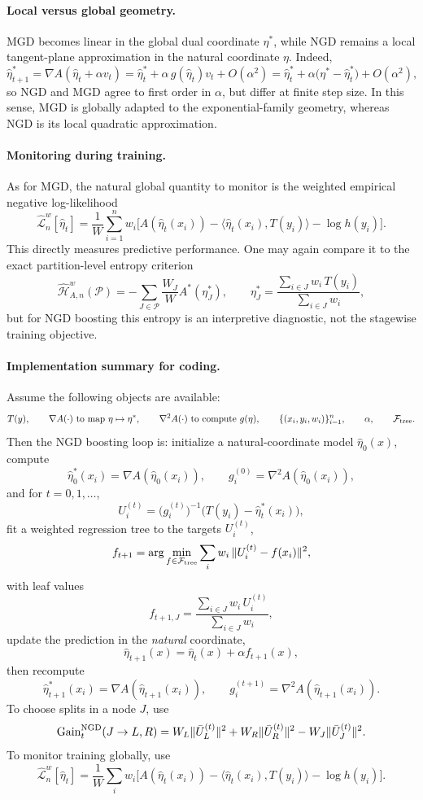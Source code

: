 \documentclass[11pt]{article}
\begin{document}
\paragraph{Local versus global geometry.}
MGD becomes linear in the global dual coordinate \(\eta^\ast\), while NGD remains a local tangent-plane approximation in the natural coordinate \(\eta\). Indeed,
\[
\hat\eta_{t+1}^\ast
=
\nabla A(\hat\eta_t+\alpha v_t)
=
\hat\eta_t^\ast+\alpha\,g(\hat\eta_t)v_t+O(\alpha^2)
=
\hat\eta_t^\ast+\alpha\big(\eta^\ast-\hat\eta_t^\ast\big)+O(\alpha^2),
\]
so NGD and MGD agree to first order in \(\alpha\), but differ at finite step size. In this sense, MGD is globally adapted to the exponential-family geometry, whereas NGD is its local quadratic approximation.

\paragraph{Monitoring during training.}
As for MGD, the natural global quantity to monitor is the weighted empirical negative log-likelihood
\[
\widehat{\mathcal L}_n^w[\hat\eta_t]
=
\frac{1}{W}\sum_{i=1}^n
w_i\Big[A(\hat\eta_t(x_i))-\langle \hat\eta_t(x_i),T(y_i)\rangle-\log h(y_i)\Big].
\]
This directly measures predictive performance. One may again compare it to the exact partition-level entropy criterion
\[
\widehat{\mathcal H}_{A,n}^w(\mathcal P)
=
-\sum_{J\in\mathcal P}\frac{W_J}{W}A^\ast(\eta_J^\ast),
\qquad
\eta_J^\ast=\frac{\sum_{i\in J}w_i\,T(y_i)}{\sum_{i\in J}w_i},
\]
but for NGD boosting this entropy is an interpretive diagnostic, not the stagewise training objective.

\paragraph{Implementation summary for coding.}
Assume the following objects are available:
\[
T(y),\qquad
\nabla A(\cdot)\ \text{to map }\eta\mapsto \eta^\ast,\qquad
\nabla^2 A(\cdot)\ \text{to compute }g(\eta),\qquad
\{(x_i,y_i,w_i)\}_{i=1}^n,\qquad
\alpha,\qquad
\mathcal F_{\rm tree}.
\]
Then the NGD boosting loop is:
initialize a natural-coordinate model \(\hat\eta_0(x)\), compute
\[
\hat\eta_0^\ast(x_i)=\nabla A(\hat\eta_0(x_i)),
\qquad
g_i^{(0)}=\nabla^2 A(\hat\eta_0(x_i)),
\]
and for \(t=0,1,\dots\),
\[
U_i^{(t)}=\bigl(g_i^{(t)}\bigr)^{-1}\bigl(T(y_i)-\hat\eta_t^\ast(x_i)\bigr),
\]
fit a weighted regression tree to the targets \(U_i^{(t)}\),
\[
f_{t+1}
=
\arg\min_{f\in\mathcal F_{\rm tree}}
\sum_i w_i\,\|U_i^{(t)}-f(x_i)\|^2,
\]
with leaf values
\[
f_{t+1,J}=\frac{\sum_{i\in J}w_i\,U_i^{(t)}}{\sum_{i\in J}w_i},
\]
update the prediction in the \emph{natural} coordinate,
\[
\hat\eta_{t+1}(x)=\hat\eta_t(x)+\alpha f_{t+1}(x),
\]
then recompute
\[
\hat\eta_{t+1}^\ast(x_i)=\nabla A(\hat\eta_{t+1}(x_i)),
\qquad
g_i^{(t+1)}=\nabla^2 A(\hat\eta_{t+1}(x_i)).
\]
To choose splits in a node \(J\), use
\[
\mathrm{Gain}^{\rm NGD}_t(J\to L,R)
=
W_L\|\bar U_L^{(t)}\|^2+W_R\|\bar U_R^{(t)}\|^2-W_J\|\bar U_J^{(t)}\|^2.
\]
To monitor training globally, use
\[
\widehat{\mathcal L}_n^w[\hat\eta_t]
=
\frac{1}{W}\sum_i
w_i\Big[A(\hat\eta_t(x_i))-\langle \hat\eta_t(x_i),T(y_i)\rangle-\log h(y_i)\Big].
\]
\end{document}
